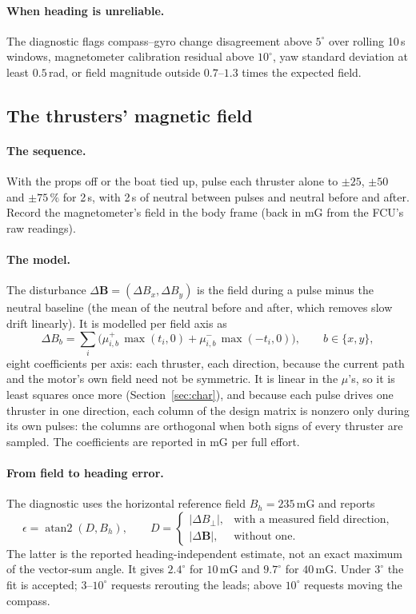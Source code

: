 \paragraph{When heading is unreliable.} The diagnostic flags compass--gyro
change disagreement above $5^\circ$ over rolling 10\,s windows, magnetometer
calibration residual above $10^\circ$, yaw standard deviation at least $0.5$\,rad,
or field magnitude outside $0.7$--$1.3$ times the expected field.

\subsection{The thrusters' magnetic field}
\label{sec:corr-mag}

\paragraph{The sequence.} With the props off or the boat tied up, pulse each thruster
alone to $\pm25$, $\pm50$ and $\pm75\,\%$ for 2\,s, with 2\,s of neutral between
pulses and neutral before and after. Record the magnetometer's field in the body
frame (back in mG from the FCU's raw readings).

\paragraph{The model.} The disturbance $\Delta\bm B = (\Delta B_x, \Delta B_y)$ is
the field during a pulse minus the neutral baseline (the mean of the neutral before
and after, which removes slow drift linearly). It is modelled per field axis as
\[
  \Delta B_b = \sum_{i}\Big(\mu^+_{i,b}\,\max(t_i, 0) + \mu^-_{i,b}\,\max(-t_i, 0)\Big),
  \qquad b\in\{x, y\},
\]
eight coefficients per axis: each thruster, each direction, because the current path
and the motor's own field need not be symmetric. It is linear in the $\mu$'s, so it
is least squares once more (Section~\ref{sec:char}), and because each pulse drives one
thruster in one direction, each column of the design matrix is nonzero only during
its own pulses: the columns are orthogonal when both signs of every thruster are sampled. The
coefficients are reported in mG per full effort.

\paragraph{From field to heading error.} The diagnostic uses the horizontal
reference field $B_h=235$\,mG and reports
\[
  \epsilon=\operatorname{atan2}(D,B_h),\qquad
  D=\begin{cases}|\Delta B_\perp|,&\text{with a measured field direction},\\
                |\Delta\bm B|,&\text{without one}.\end{cases}
\]
The latter is the reported heading-independent estimate, not an exact maximum
of the vector-sum angle. It gives $2.4^\circ$ for $10$\,mG and $9.7^\circ$ for
$40$\,mG. Under $3^\circ$ the fit is accepted; $3$--$10^\circ$ requests rerouting
the leads; above $10^\circ$ requests moving the compass.

